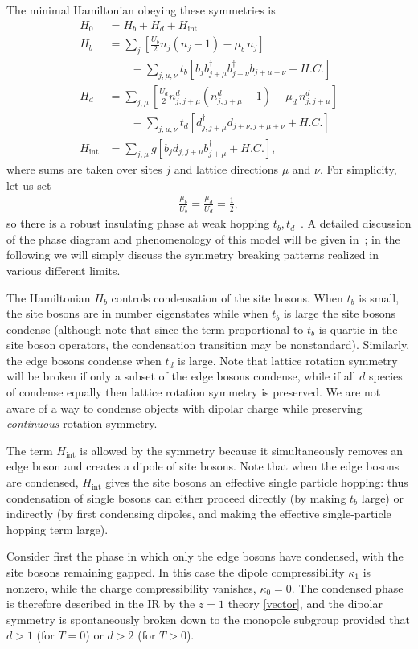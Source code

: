 \documentclass[pra,aps,twocolumn, amsfonts,amsmath,amssymb,nofootinbib,superscriptaddress]{revtex4-2}
\newcommand{\nn}{\nonumber\\}
\begin{document}
The minimal Hamiltonian obeying these symmetries is  
\begin{align}
H_0  &= H_b + H_d + H_\text{int}\nn
H_b &= \sum_j \left[ \frac{U_b}{2}  n_j (n_j-1) - \mu_b \, n_j \right] \nn
&\qquad - \sum_{j,\mu,\nu} t_b \left[  b_j b^{\dag}_{j+\mu} b^{\dag}_{j+\nu} b_{j+\mu+\nu} + H.C. \right]\nn
H_d &= \sum_{j,\mu} \left[ \frac{U_d}{2} n^d_{j,j+\mu} (n^d_{j,j+\mu} - 1) -\mu_d \, n^d_{j, j + \mu} \right]\nn
&\qquad  - \sum_{j,\mu,\nu} t_d \left[d^{\dag}_{j, j + \mu} d_{j + \nu, j+\mu + \nu} +H.C.\right]\nn
H_\text{int} &= \sum_{j,\mu} g\left[ b_j d_{j,j+\mu} b^\dag_{j+\mu} + H.C. \right],
\end{align}
where sums are taken over sites $j$ and lattice directions $\mu$ and $\nu$.  
For simplicity, let us set 
\begin{align}
\frac{\mu_b}{ U_b} = \frac{\mu_d }{ U_d} = \frac{1}{2},
\end{align}
so there is a robust insulating phase at weak hopping $t_b, t_d$~\cite{Fisheretal}. A detailed discussion of the phase diagram and phenomenology of this model will be given in~\cite{dbhm}; in the following we will simply discuss the symmetry breaking patterns realized in various different limits. 

The Hamiltonian $H_b$ controls condensation of the site bosons. When $t_b$ is small, the site bosons are in number eigenstates while when $t_b$ is large the site bosons condense (although note that since the term proportional to $t_b$ is quartic in the site boson operators, the condensation transition may be nonstandard). Similarly, the edge bosons condense when $t_d$ is large. Note that lattice rotation symmetry will be broken if only a subset of the edge bosons condense, while if all $d$ species of condense equally then lattice rotation symmetry is preserved. We are not aware of a way to condense objects with dipolar charge while preserving {\it continuous} rotation symmetry. 

The term $H_\text{int}$ is allowed by the symmetry because it simultaneously removes an edge boson and creates a dipole of site bosons. Note that when the edge bosons are condensed, $H_\text{int}$ gives the site bosons an effective single particle hopping: thus condensation of single bosons can either proceed directly (by making $t_b$ large) or indirectly (by first condensing dipoles, and making the effective single-particle hopping term large). 

Consider first the phase in which only the edge bosons have condensed, with the site bosons remaining gapped. In this case the dipole compressibility $\kappa_1$ is nonzero, while the charge compressibility vanishes, $\kappa_0=0$. The condensed phase is therefore described in the IR by the $z=1$ theory \eqref{vector}, and the dipolar symmetry is spontaneously broken down to the monopole subgroup provided that $d>1$ (for $T=0$) or $d>2$ (for $T>0$). 
\end{document}
